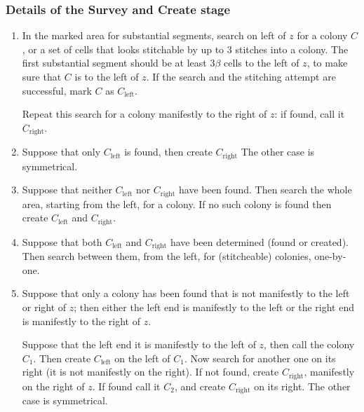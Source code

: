 \documentclass[12pt]{memoir}
\newcommand{\Left}{\text{left}}
\newcommand{\Right}{\text{right}}
\begin{document}
\subsubsection*{Details of the Survey and Create stage}

\begin{enumerate}[label=s\arabic*., ref=s\arabic*]
\item\label{i:survey.left}
In the marked area for substantial segments,  search on left of \( z \) for a colony \( C \),
or a set of cells that looks stitchable by up to 3 stitches into a colony.
The first substantial segment should be at least \( 3\beta \) cells to the left of \( z \),
to make sure that \( C \) is  to the left of \( z \).
If the search and the stitching attempt are successful, mark \( C \) as \( C_{\Left} \).

Repeat this search for a colony manifestly to the right of \( z \): if found, call it \( C_{\Right} \).

\item Suppose that only \( C_{\Left} \) is found, then create \( C_{\Right} \)
The other case is symmetrical.

\item Suppose that neither \( C_{\Left} \) nor \( C_{\Right} \) have been found.
Then search the whole area, starting from the left, for a colony.
If no such colony is found then create \( C_{\Left} \) and \( C_{\Right} \).

\item\label{i:survey.both} Suppose that both \( C_{\Left} \) and \( C_{\Right} \) 
have been determined (found or created).
Then search between them, from the left, for (stitcheable) colonies, one-by-one.

\item Suppose that only a colony has been found that 
is not manifestly to the left or right of \( z \); then either the left end is manifestly to the left or
the right end is manifestly to the right of \( z \).

Suppose that the left end it is manifestly to the left of \( z \), then call the colony \( C_{1} \).
Then create \( C_{\Left} \) on the left of  \( C_{1} \).
Now search for another one on its right (it is not manifestly on the right).
If not found, create \( C_{\Right} \), manifestly on the right of \( z \).
If found call it \( C_{2} \), and create \( C_{\Right} \) on its right.
The other case is symmetrical.

\end{enumerate}
\end{document}
